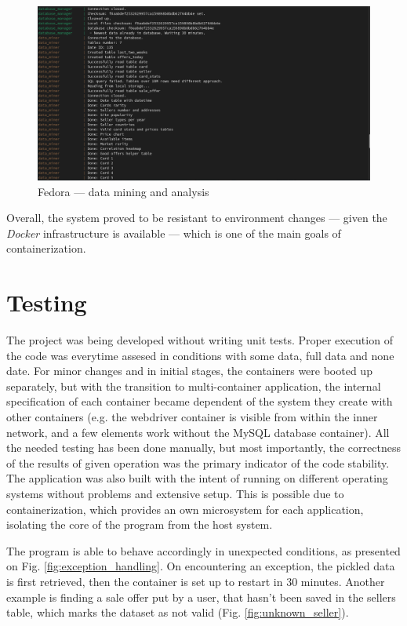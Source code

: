\begin{figure}
    \centering
    \includegraphics[width=\textwidth]{figures/fedora_miner.png}
    \caption{Fedora --- data mining and analysis}
    \label{fig:fedora_miner}
\end{figure}

Overall, the system proved to be resistant to environment changes --- given the \textit{Docker} infrastructure is available --- which is one of the main goals of containerization.

\section{Testing}
\label{s:testing}
The project was being developed without writing unit tests. Proper execution of the code was everytime assesed in conditions with some data, full data and none date. For minor changes and in initial stages, the containers were booted up separately, but with the transition to multi-container application, the internal specification of each container became dependent of the system they create with other containers (e.g. the webdriver container is visible from within the inner network, and a few elements work without the MySQL database container). All the needed testing has been done manually, but most importantly, the correctness of the results of given operation was the primary indicator of the code stability. The application was also built with the intent of running on different operating systems without problems and extensive setup. This is possible due to containerization, which provides an own microsystem for each application, isolating the core of the program from the host system. \par
The program is able to behave accordingly in unexpected conditions, as presented on Fig. \ref{fig:exception_handling}. On encountering an exception, the pickled data is first retrieved, then the container is set up to restart in 30 minutes. Another example is finding a sale offer put by a user, that hasn't been saved in the sellers table, which marks the dataset as not valid (Fig. \ref{fig:unknown_seller}).

